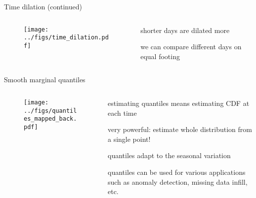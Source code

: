 \documentclass[aspectratio=169,11pt]{beamer}
\begin{document}
\begin{frame}{Time dilation (continued)}
\begin{columns}
	\begin{column}{0.5\textwidth}
		\begin{figure}
			\centering
			\texttt{[image: ../figs/time\_dilation.pdf]}
		\end{figure}
	\end{column}
	\begin{column}{0.5\textwidth}
		\BIT
			\item shorter days are dilated more
			\item we can compare different days on equal footing 
		\EIT
	\end{column}
\end{columns}

\end{frame}




\begin{frame}{Smooth marginal quantiles}
\begin{columns}
	\begin{column}{0.5\textwidth}
		\begin{figure}
			\centering
			\texttt{[image: ../figs/quantiles\_mapped\_back.pdf]}
		\end{figure}
	\end{column}
	\begin{column}{0.5\textwidth}
		\BIT
		\item estimating quantiles means estimating CDF at each time
		\item very powerful: estimate whole distribution from a single point!
		\item quantiles adapt to the seasonal variation
		\item quantiles can be used for various applications
		such as anomaly detection, missing data infill, etc.
		\EIT
	\end{column}
\end{columns}
\end{frame}
\end{document}
